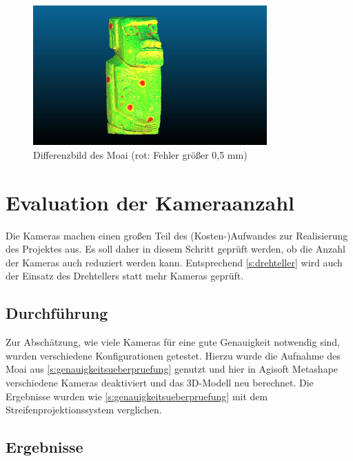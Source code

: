 \documentclass[./00PhotoBox.tex]{subfiles}
\begin{document}
\begin{figure}
    \centering
    \includegraphics[width=0.8\textwidth]{img/moai_fehler_drehteller.jpg}
    \caption{Differenzbild des Moai (rot: Fehler größer 0,5 mm)}
    \label{img:drehteller_moai_fehler}
\end{figure}



\section{Evaluation der Kameraanzahl}
Die Kameras machen einen großen Teil des (Kosten-)Aufwandes zur Realisierung des Projektes aus. Es soll daher in diesem Schritt geprüft werden, ob die Anzahl der Kameras auch reduziert werden kann. Entsprechend \autoref{s:drehteller} wird auch der Einsatz des Drehtellers statt mehr Kameras geprüft.

\subsection{Durchführung}
Zur Abschätzung, wie viele Kameras für eine gute Genauigkeit notwendig sind, wurden verschiedene Konfigurationen getestet. Hierzu wurde die Aufnahme des Moai aus \autoref{s:genauigkeitsueberpruefung} genutzt und hier in Agisoft Metashape verschiedene Kameras deaktiviert und das 3D-Modell neu berechnet. Die Ergebnisse wurden wie \autoref{s:genauigkeitsueberpruefung} mit dem Streifenprojektionssystem verglichen.

\subsection{Ergebnisse}



\biblio
\end{document}
